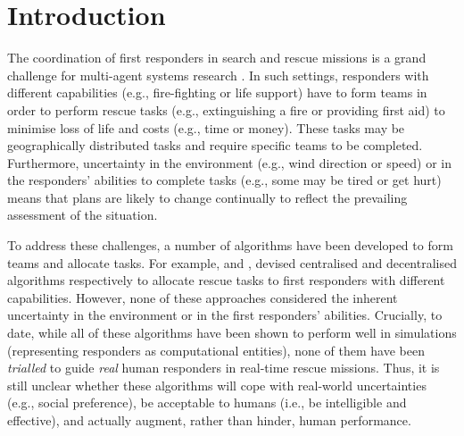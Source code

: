 \section{Introduction}
\noindent The coordination of first responders in search and rescue missions is a grand challenge for multi-agent systems research \cite{kitano:2001}. In such settings, responders with different capabilities (e.g., fire-fighting or life support) have to form teams in order to perform rescue tasks  (e.g., extinguishing a fire or providing first aid) to minimise  loss of life and costs (e.g., time or money). These tasks may be geographically distributed tasks and require specific teams  to be completed. Furthermore, uncertainty in the environment (e.g., wind direction or speed) or in the responders' abilities to complete tasks (e.g., some may be tired or get hurt) means that plans are likely to change continually to reflect the prevailing assessment of the situation. 

To address these challenges, a number of algorithms  have been developed to form teams and allocate tasks. For example, \cite{ramchurn:etal:2010,Scerri2005} and \cite{Chapman2009}, devised centralised and decentralised algorithms respectively to allocate rescue tasks to first responders with different capabilities. However, none of these approaches considered the inherent uncertainty in the environment or in the first responders' abilities. Crucially, to date, while all of these algorithms have been shown to perform well in simulations (representing responders as computational entities), none of them have been \emph{trialled} to guide \emph{real} human responders in real-time rescue missions. Thus, it is still unclear whether these algorithms will cope with real-world uncertainties (e.g., social preference), be acceptable to humans (i.e., be intelligible and effective), and actually augment, rather than hinder,  human performance.

